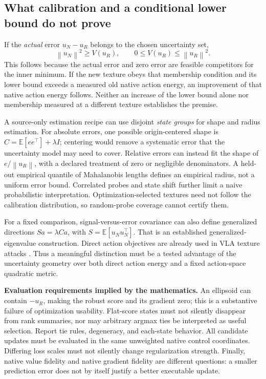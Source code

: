 \documentclass[10pt,a4paper]{article}
\newcommand{\norm}[1]{\left\|#1\right\|}
\begin{document}
\newpage
\subsection*{What calibration and a conditional lower bound do not prove}
If the \emph{actual} error $u_N-u_R$ belongs to the chosen uncertainty set,
\begin{equation}\label{eq:conditionalvalue}
 \norm{u_N}^2\geq V(u_R),\qquad 0\leq V(u_R)\leq\norm{u_R}^2.
\end{equation}
This follows because the actual error and zero error are feasible competitors
for the inner minimum. If the new texture obeys that membership condition and
its lower bound exceeds a measured old native action energy, an improvement
of that native action energy follows. Neither an increase of the lower bound
alone nor membership measured at a different texture establishes the premise.

A source-only estimation recipe can use disjoint \emph{state groups} for shape
and radius estimation. For absolute errors, one possible origin-centered shape
is $C=\mathbb E[ee^\top]+\lambda I$; centering would remove a systematic error
that the uncertainty model may need to cover. Relative errors can instead fit
the shape of $e/\norm{u_R}$, with a declared treatment of zero or negligible
denominators. A held-out empirical quantile of Mahalanobis lengths defines an
empirical radius, not a uniform error bound. Correlated probes and state shift
further limit a naive probabilistic interpretation. Optimization-selected
textures need not follow the calibration distribution, so random-probe
coverage cannot certify them.

For a fixed comparison, signal-versus-error covariance can also define
generalized directions $S a=\lambda C a$, with $S=\mathbb E[u_Nu_N^\top]$.
That is an established generalized-eigenvalue construction. Direct action
objectives are already used in VLA texture attacks \cite{unitexture}. Thus a
meaningful distinction must be a tested advantage of the uncertainty geometry
over both direct action energy and a fixed action-space quadratic metric.

\textbf{Evaluation requirements implied by the mathematics.}
An ellipsoid can contain $-u_R$, making the robust score and its gradient zero;
this is a substantive failure of optimization usability. Flat-score states
must not silently disappear from rank summaries, nor may arbitrary argmax
ties be interpreted as useful selection. Report tie rules, degeneracy, and
each-state behavior. All candidate updates must be evaluated in the same
unweighted native control coordinates. Differing loss scales must not silently
change regularization strength. Finally, native value fidelity and native
gradient fidelity are different questions: a smaller prediction error does
not by itself justify a better executable update.
\end{document}
